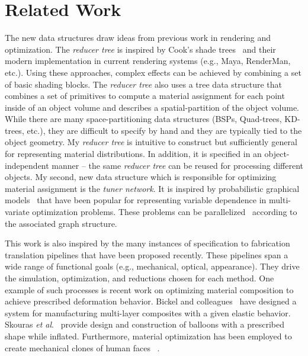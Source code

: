 \chapter{Related Work}
\label{chap:relate}
The new data structures draw ideas from previous work in rendering and optimization.
The \emph{reducer tree} is inspired by Cook's shade trees~\cite{Cook1984} and their modern implementation in current rendering systems (e.g., Maya, RenderMan, etc.). Using these approaches, complex effects can be achieved by combining a set of basic shading blocks. The \emph{reducer tree} also uses a tree data structure that combines a set of primitives to compute a material assignment for each point inside of an object volume and describes a spatial-partition of the object volume. While there are many space-partitioning data structures (BSPs, Quad-trees, KD-trees, etc.), they are difficult to specify by hand and they are typically tied to the object geometry.
My \emph{reducer tree} is intuitive to construct but sufficiently general for representing material distributions.
In addition, it is specified in an object-independent manner -- the same \emph{reducer tree} can be reused for processing different objects.
My second, new data structure which is responsible for optimizing material assignment is the \emph{tuner network}.
It is inspired by probabilistic graphical models~\cite{Jordan:1999} that have been popular for representing variable dependence in multi-variate optimization problems.
These problems can be parallelized~\cite{GraphLab} according to the associated graph structure.

This work is also inspired by the many instances of specification to fabrication translation pipelines that have been proposed recently.
These pipelines span a wide range of functional goals (e.g., mechanical, optical, appearance).
They drive the simulation, optimization, and reductions chosen for each method. 
One example of such processes is recent work on optimizing material composition
to achieve prescribed deformation behavior. 
Bickel and colleagues~ have designed a system
for manufacturing multi-layer composites with a given elastic behavior.
Skouras \textit{et al}.~ provide design and construction of balloons
with a prescribed shape while inflated.
Furthermore, material optimization has been employed to create mechanical clones of human faces ~\cite{Bickel:2012}.

